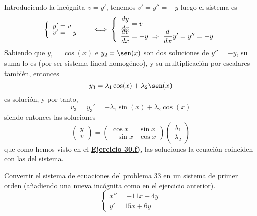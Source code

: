 \begin{sol}
    Introduciendo la incógnita $v=y'$, tenemos $v'=y''=-y$ luego el sistema es
    $$\left\{ \begin{array}{ll}
         y'=v & \; \\
         \vspace{-5mm} \\
         v'=-y  & \; 
    \end{array} \right. \iff \left\{ \begin{array}{ll}
         \dfrac{dy}{dx}=v  \\
         \vspace{-5mm} \\
         \dfrac{dv}{dx}=-y \; \Rightarrow \; \dfrac{d}{dx}y'=y''=-y
    \end{array} \right.$$
    Sabiendo que $y_1=\cos(x)$ e $y_2=\sen(x)$ son dos soluciones de $y''=-y$, su suma lo es (por ser sistema lineal homogéneo), y su multiplicación por escalares también, entonces 
    $$y_3=\lambda_1 \cos(x) + \lambda_2 \sen(x)$$ es solución, y por tanto, 
    $$v_3=y_3'=-\lambda_1 \sin(x)+\lambda_2\cos(x)$$
    siendo entonces las soluciones
    $$\begin{pmatrix}
        y\\
        v
    \end{pmatrix}=\begin{pmatrix}
        \cos x & \sin x \\
        -\sin x & \cos x
    \end{pmatrix}\begin{pmatrix}
        \lambda_1\\
        \lambda_2
    \end{pmatrix}$$
    que como hemos visto en el \hyperref[30f]{\textbf{Ejercicio 30.f)}}, las soluciones la ecuación coinciden con las del sistema. 
\end{sol}
\begin{ejer}
    Convertir el sistema de ecuaciones del problema 33 en un sistema de primer orden (añadiendo una nueva incógnita como en el ejercicio anterior).
    $$\left\{ \begin{array}{l}
         x'' = -11x + 4y  \\
         y' = 15x + 6y
    \end{array}\right.$$
\end{ejer}
